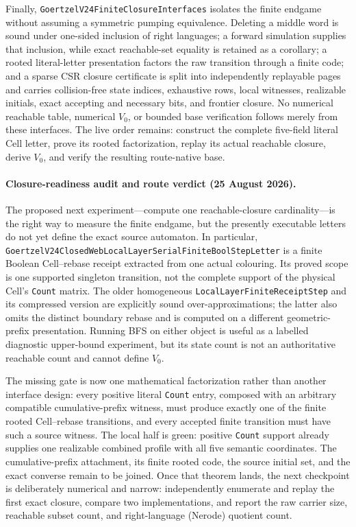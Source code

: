 \documentclass[11pt]{article}
\theoremstyle{definition}
\begin{document}
Finally, \texttt{GoertzelV24FiniteClosureInterfaces} isolates the finite
endgame without assuming a symmetric pumping equivalence.  Deleting a middle
word is sound under one-sided inclusion of right languages; a forward
simulation supplies that inclusion, while exact reachable-set equality is
retained as a corollary; a rooted literal-letter presentation
factors the raw transition through a finite code; and a sparse CSR closure
certificate is split into independently replayable pages and carries
collision-free state indices, exhaustive rows, local
witnesses, realizable initials, exact accepting and necessary bits, and
frontier closure.  No numerical reachable table, numerical $V_0$, or bounded
base verification follows merely from these interfaces.  The live order
remains: construct the complete five-field literal Cell letter, prove its
rooted factorization, replay its actual reachable closure, derive $V_0$, and
verify the resulting route-native base.

\paragraph{Closure-readiness audit and route verdict (25 August 2026).}
The proposed next experiment---compute one reachable-closure cardinality---is
the right way to measure the finite endgame, but the presently executable
letters do not yet define the exact source automaton.  In particular,
\texttt{GoertzelV24ClosedWebLocalLayerSerialFiniteBoolStepLetter} is a finite
Boolean Cell--rebase receipt extracted from one actual colouring.  Its proved
scope is one supported singleton transition, not the complete support of the
physical Cell's \texttt{Count} matrix.  The older homogeneous
\texttt{LocalLayerFiniteReceiptStep} and its compressed version are explicitly
sound over-approximations; the latter also omits the distinct boundary rebase
and is computed on a different geometric-prefix presentation.  Running BFS on
either object is useful as a labelled diagnostic upper-bound experiment, but
its state count is not an authoritative reachable count and cannot define
$V_0$.

The missing gate is now one mathematical factorization rather than another
interface design: every positive literal \texttt{Count} entry, composed with
an arbitrary compatible cumulative-prefix witness, must produce exactly one
of the finite rooted Cell--rebase transitions, and every accepted finite
transition must have such a source witness.  The local half is green: positive
\texttt{Count} support already supplies one realizable combined profile with
all five semantic coordinates.  The cumulative-prefix attachment, its finite
rooted code, the source initial set, and the exact converse remain to be
joined.  Once that theorem lands, the next checkpoint is deliberately
numerical and narrow: independently enumerate and replay the first exact
closure, compare two implementations, and report the raw carrier size,
reachable subset count, and right-language (Nerode) quotient count.
\end{document}
